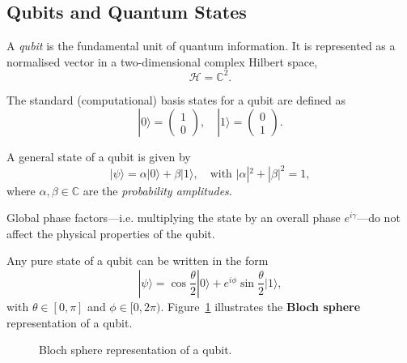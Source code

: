 

\subsection{Qubits and Quantum States}
\label{subsec:qubits}

\begin{definition}[Qubit]
A \emph{\gls{qubit}} is the fundamental unit of quantum information. It is represented as a normalised vector in a two-dimensional complex Hilbert space,
\[
\mathcal{H} = \mathbb{C}^2.
\]
\end{definition}

\begin{notation}
The standard (computational) basis states for a qubit are defined as
\[
|0\rangle = \begin{pmatrix} 1 \\ 0 \end{pmatrix}, \quad |1\rangle = \begin{pmatrix} 0 \\ 1 \end{pmatrix}.
\]
\end{notation}

\begin{definition}
A general state of a \gls{qubit} is given by
\[
|\psi\rangle = \alpha|0\rangle + \beta|1\rangle, \quad \text{with } |\alpha|^2 + |\beta|^2 = 1,
\]
where \(\alpha,\beta \in \mathbb{C}\) are the \emph{probability amplitudes}.
\end{definition}

\begin{remark}
Global phase factors—i.e. multiplying the state by an overall phase \(e^{i\gamma}\)—do not affect the physical properties of the qubit.
\end{remark}

\begin{example}
Any pure state of a \gls{qubit} can be written in the form
\[
|\psi\rangle = \cos\frac{\theta}{2}|0\rangle + e^{i\phi}\sin\frac{\theta}{2}|1\rangle,
\]
with \(\theta \in [0,\pi]\) and \(\phi \in [0,2\pi)\). Figure~\ref{fig:bloch_sphere} illustrates the \textbf{Bloch sphere} representation of a qubit.
\end{example}

\begin{figure}[h]
\centering
{}
\caption{Bloch sphere representation of a \gls{qubit}.}
\label{fig:bloch_sphere}
\end{figure}

